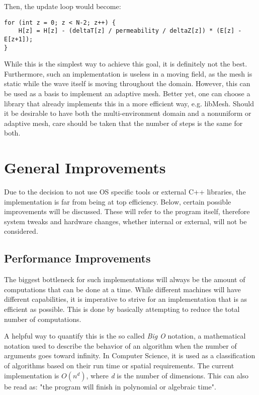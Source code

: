 \clearpage

Then, the update loop would become:

\begin{verbatim}
for (int z = 0; z < N-2; z++) {
	H[z] = H[z] - (deltaT[z] / permeability / deltaZ[z]) * (E[z] - E[z+1]);
}
\end{verbatim}

While this is the simplest way to achieve this goal, it is definitely not the best. Furthermore, such an implementation is useless in a moving field, as the mesh is static while the wave itself is moving throughout the domain. However, this can be used as a basis to implement an adaptive mesh. Better yet, one can choose a library that already implements this in a more efficient way, e.g. libMesh\textsuperscript{\cite{kirk2006libmesh}}. Should it be desirable to have both the multi-environment domain and a nonuniform or adaptive mesh, care should be taken that the number of steps is the same for both.

\section{General Improvements}

Due to the decision to not use OS specific tools or external C++ libraries, the implementation is far from being at top efficiency. Below, certain possible improvements will be discussed. These will refer to the program itself, therefore system tweaks and hardware changes, whether internal or external, will not be considered.

\subsection{Performance Improvements}

The biggest bottleneck for such implementations will always be the amount of computations that can be done at a time. While different machines will have different capabilities, it is imperative to strive for an implementation that is as efficient as possible. This is done by basically attempting to reduce the total number of computations.

A helpful way to quantify this is the so called \textit{Big O} notation, a mathematical notation used to describe the behavior of an algorithm when the number of arguments goes toward infinity. In Computer Science, it is used as a classification of algorithms based on their run time or spatial requirements\textsuperscript{\cite{mohr2014quantum}}. The current implementation is $O(n^d)$, where \textit{d} is the number of dimensions. This can also be read as: "the program will finish in polynomial or algebraic time".

